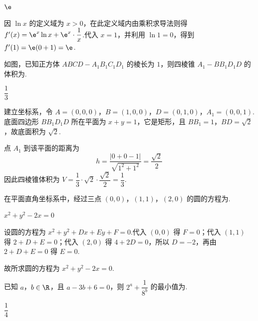 \begin{answer}
\(\e\)
\end{answer}

\begin{solution}
因 \(\ln x\) 的定义域为 \(x>0\)，在此定义域内由乘积求导法则得
\(f'(x)=\e^x\ln x+\e^x\cdot\dfrac1x\).代入 \(x=1\)，并利用 \(\ln1=0\)，得到 \(f'(1)=\e(0+1)=\e\).
\end{solution}

\begin{problem}
如图，已知正方体 \(ABCD-A_1B_1C_1D_1\) 的棱长为 \(1\)，则四棱锥 \(A_1-BB_1D_1D\) 的体积为\fillinblank{}.

\end{problem}

\begin{answer}
\(\dfrac13\)
\end{answer}

\begin{solution}
建立坐标系，令 \(A=(0,0,0)\)，\(B=(1,0,0)\)，\(D=(0,1,0)\)，\(A_1=(0,0,1)\).底面四边形 \(BB_1D_1D\) 所在平面为 \(x+y=1\)，它是矩形，且 \(BB_1=1\)，\(BD=\sqrt2\)，故底面积为 \(\sqrt2\).

点 \(A_1\) 到该平面的距离为
\[
h=\frac{|0+0-1|}{\sqrt{1^2+1^2}}=\frac{\sqrt2}{2}
\]
因此四棱锥体积为 \(V=\dfrac13\cdot\sqrt2\cdot\dfrac{\sqrt2}{2}=\dfrac13\).
\end{solution}

\begin{problem}
在平面直角坐标系中，经过三点 \((0,0)\)，\((1,1)\)，\((2,0)\) 的圆的方程为\fillinblank{}.
\end{problem}

\begin{answer}
\(x^2+y^2-2x=0\)
\end{answer}

\begin{solution}
设圆的方程为 \(x^2+y^2+Dx+Ey+F=0\).代入 \((0,0)\) 得 \(F=0\)；代入 \((1,1)\) 得 \(2+D+E=0\)；代入 \((2,0)\) 得 \(4+2D=0\)，所以 \(D=-2\)，再由 \(2+D+E=0\) 得 \(E=0\).

故所求圆的方程为 \(x^2+y^2-2x=0\).
\end{solution}

\begin{problem}
已知 \(a\)，\(b\in\R\)，且 \(a-3b+6=0\)，则 \(2^a+\dfrac1{8^b}\) 的最小值为\fillinblank{}.
\end{problem}

\begin{answer}
\(\dfrac14\)
\end{answer}

